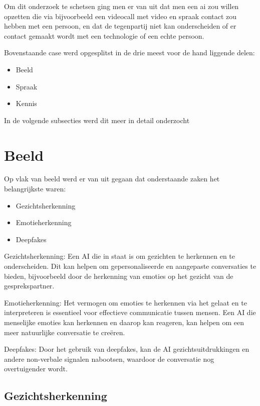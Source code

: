 Om dit onderzoek te schetsen ging men er van uit dat men een ai zou willen opzetten die via bijvoorbeeld een videocall met video en spraak contact zou hebben met een persoon, en dat de tegenpartij niet kan onderscheiden of er contact gemaakt wordt met een technologie of een echte persoon.

Bovenstaande case werd opgesplitst in de drie meest voor de hand liggende delen:

\begin{itemize}
    \item Beeld
    \item Spraak
    \item Kennis
\end{itemize}

In de volgende subsecties werd dit meer in detail onderzocht

\newpage

\section{Beeld}

Op vlak van beeld werd er van uit gegaan dat onderstaande zaken het belangrijkste waren:

\begin{itemize}
    \item Gezichtsherkenning
    \item Emotieherkenning
    \item Deepfakes
\end{itemize}

Gezichtsherkenning: Een AI die in staat is om gezichten te herkennen en te onderscheiden. Dit kan helpen om gepersonaliseerde en aangepaste conversaties te bieden, bijvoorbeeld door de herkenning van emoties op het gezicht van de gesprekspartner.

Emotieherkenning: Het vermogen om emoties te herkennen via het gelaat en te interpreteren is essentieel voor effectieve communicatie tussen mensen. Een AI die menselijke emoties kan herkennen en daarop kan reageren, kan helpen om een meer natuurlijke conversatie te creëren.

Deepfakes: Door het gebruik van deepfakes, kan de AI gezichtsuitdrukkingen en andere non-verbale signalen nabootsen, waardoor de conversatie nog overtuigender wordt.

\newpage

\subsection{Gezichtsherkenning}

